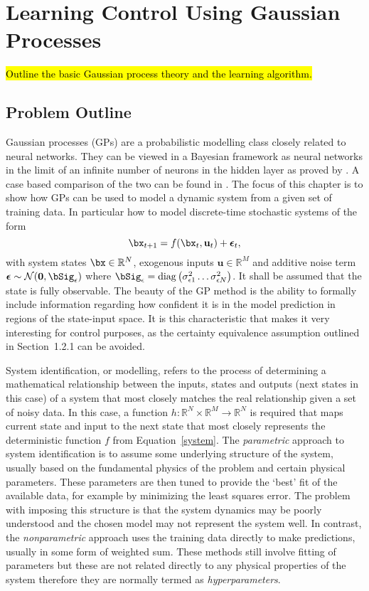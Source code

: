 \chapter{Learning Control Using Gaussian Processes} 
\hl{Outline the basic Gaussian process theory and the learning algorithm.}

\section{Problem Outline}
Gaussian processes (GPs) are a probabilistic modelling class closely related to neural networks. They can be viewed in a Bayesian framework as neural networks in the limit of an infinite number of neurons in the hidden layer as proved by \cite{Neal95}. A case based comparison of the two can be found in \cite{KLBG03}. The focus of this chapter is to show how GPs can be used to model a dynamic system from a given set of training data. In particular how to model discrete-time stochastic systems of the form
\begin{equation} \label{system}
\bx_{t+1}=f(\bx_{t},\mathbf{u}_{t}) + \boldsymbol{\epsilon}_{t},
\end{equation}
with system states $\bx \in \mathbb{R}^N$, exogenous inputs $\mathbf{u} \in \mathbb{R}^M$ and additive noise term $\boldsymbol{\epsilon} \sim \mathcal{N}(\mathbf{0},\bSig_\epsilon)$ where $\bSig_\epsilon = \mathrm{diag}\left(\sigma^{2}_{\epsilon1}\dots\sigma^{2}_{\epsilon N}\right)$. It shall be assumed that the state is fully observable. The beauty of the GP method is the ability to formally include information regarding how confident it is in the model prediction in regions of the state-input space. It is this characteristic that makes it very interesting for control purposes, as the certainty equivalence assumption outlined in Section~1.2.1 can be avoided.

System identification, or modelling, refers to the process of determining a mathematical relationship between the inputs, states and outputs (next states in this case) of a system that most closely matches the real relationship given a set of noisy data. In this case, a function $h: \mathbb{R}^N \times \mathbb{R}^M \rightarrow \mathbb{R}^N$ is required that maps current state and input to the next state that most closely represents the deterministic function $f$ from Equation~\eqref{system}. The \textit{parametric} approach to system identification is to assume some underlying structure of the system, usually based on the fundamental physics of the problem and certain physical parameters. These parameters are then tuned to provide the `best' fit of the available data, for example by minimizing the least squares error. The problem with imposing this structure is that the system dynamics may be poorly understood and the chosen model may not represent the system well. In contrast, the \textit{nonparametric} approach uses the training data directly to make predictions, usually in some form of weighted sum. These methods still involve fitting of parameters but these are not related directly to any physical properties of the system therefore they are normally termed as \textit{hyperparameters}.


